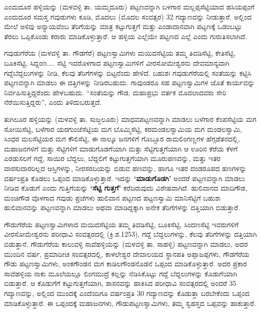 ಎಂಮದೂರ ಹಳ್ಳಿಯನ್ನು (ಮಳವಳ್ಳಿ ತಾ. ಯಮ್ಮದೂರು) ಪಟ್ಟಣವನ್ನಾಗಿ ಬಳಗಾರ ಮಲ್ಲಪ್ಪಸೆಟ್ಟಿಯಾದ ಹಸಿಯಪ್ಪಂಗೆ ಎಂಮದೂರ ಸಮಸ್ತ ಗವುಡುಗಳು ಕೂಡಿ, ಮೊದಲು (ಮೊದಲ ಸಂವತ್ಸರ) 32 ಗದ್ಯಾಣವನ್ನು ನೀಡುತ್ತಾರೆ. ಅಲ್ಲಿಂದ ಮೇಲೆ ಅಳಿವು ಅನ್ಯಾಯವೆಂಬ ತೆರಿಗೆಯನ್ನು ಮಾತ್ರ ಕಟ್ಟುಗುತ್ತಗೆ ಮತ್ತು ಪಿಂಡಾದಾನವಾಗಿ ಪಟ್ಟಣಕ್ಕೆ ಒಡಂಬಟ್ಟು ತೆರಲು ಒಪ್ಪಿಕೊಂಡು ಕರಾರು ಮಾಡಿಕೊಳ್ಳುತ್ತಾರೆ. ಆ ಹಳ್ಳಿಯ ಎಲ್ಲೆಯೇ ಪಟ್ಟಣದ ಎಲ್ಲೆ ಎಂದು ಗುರುತಿಸಲಾಗಿದೆ.

ಗವುಡುಗೆರೆಯ (ಮಳವಳ್ಳಿ ತಾ. ಗೌಡಗೆರೆ) ಪಟ್ಟಣಸ್ವಾಮಿಗಳು ಮಯಿದಸೆಟ್ಟಿಯ ತಮ್ಮ ತಿವಡಿಸೆಟ್ಟಿ, ಕೇತಿಸೆಟ್ಟಿ, ಬೂಕಿಸೆಟ್ಟಿ, ಸಿದ್ದಂಣ.... ಸೆಟ್ಟಿ ಇವರೊಳಗಾದ ಪಟ್ಟಣಸ್ವಾಮಿಗಳಿಗೆ ವೀರಸೋಮೇಶ್ವರನು ದೇವಮಾನ್ಯವಾಗಿ ಗದ್ದೆಬೆದ್ದಲುಗಳನ್ನು ನೀಡಿ, ಕೆಲವು ತೆರಿಗೆಗಳನ್ನು ಬಿಟ್ಟನೆಂದು ಹೇಳಿದೆ. ಬಹುಶಃ ಗವುಡುಗೆರೆಯಲ್ಲಿ ಸಂತೆಯನ್ನು ಕಟ್ಟಿಸಿ ಪಟ್ಟಣವನ್ನಾಗಿ ಮಾಡಲು ಈ ದತ್ತಿಗಳನ್ನು ನೀಡಿರಬಹುದು. ಗಾವುಂಡರೂ ಸಹ ಪಟ್ಟಣಸ್ವಾಮಿಗಳ ಜೊತೆ ಕಾರ್ಯವನ್ನು ನಿರ್ವಹಿಸುತ್ತಿದ್ದರೆಂದು ಹೇಳಬಹುದು. “ಸಂತೆಯನ್ನು ಗೌಡ, ಮಹಾಪ್ರಭು ವರ್ತಕ ಮೊದಲಾದವರು ಸೇರಿ ನೆರೆಯಿಸುತ್ತಿದ್ದರು”, ಎಂದು ತಿಳಿದುಬರುತ್ತದೆ.

ತುಗಿಲೂರ ಹಳ್ಳಿಯನ್ನು (ಮಳವಳ್ಳಿ ತಾ. ಸುಜ್ಜಲೂರು) ಮಾಧವಪಟ್ಟಣವನ್ನಾಗಿ ಮಾಡಲು ಬಳೆಗಾರ ಕೆಂಪಸೆಟ್ಟಿಯ ಮಗ ಸೋಯಿಸೆಟ್ಟಿ, ಬಳೆಗಾರ ಯರಗುಂಜೆಸೆಟ್ಟಿಯ ಮಗ ಬೊಮ್ಮಿಸೆಟ್ಟಿ, ಕರಮಂಡಲಸ್ವಾಮಿಯ ಮಗ ಮಂಡಲಸ್ವಾಮಿ, ಸಿಂಧರ ಮಲಸೆಟ್ಟಿಯರ ಮಗ ಕೌಲಿಸೆಟ್ಟಿ, ಈ ನಾಲ್ಕೂ ಜನಗಳಿಗೆ ಗೊಬ್ಬೂರ ರಾಮಲಿಂಗಣ್ಣಗಳ ಹೆಗ್ಗಡೆತನದಲ್ಲಿ, ಮಹಾಜನಗಳಿಗೆ ಮತ್ತು ಸೆಟ್ಟಿಗಳಿಗೆ ಮಾಡುಗೊಡಗೆಯಾಗಿ ಮತ್ತು ಸೆಟ್ಟಿಗುತ್ತಗೆಯಾಗಿ ಆ ಊರಿನ ಕೆರೆಯ ಕೆಳಗೆ ಎರಡುಸಲಗೆ ಗದ್ದೆ, ಸಾಯಿರ ಬೆದ್ದಲು, ಬೆದ್ದಲಿಗೆ ಕಟ್ಟುಗುತ್ತಗೆಯಾಗಿ ಮೂರುಪಣವನ್ನು, ಮತ್ತು ಇತರ ವಾರಸುದಾರರಿಲ್ಲದ ಆಸ್ತಿಗಳನ್ನು, ನೀರಸರದಿಯನ್ನು ಬಿಡುವ ಹಣವನ್ನು, ಹಾಗೂ ಇತರ ದಂಡರೂಪದ ಹಣಗಳನ್ನು ವರ್ಷಂಪ್ರತಿ ಕೊಡಲು ಒಪ್ಪಂದ ಮಾಡಿಕೊಳ್ಳುತ್ತಾರೆ. ಇದನ್ನು \textbf{‘ಮಾಡುಗೊಡಗಿ’} ಅಂದರೆ ಪಟ್ಟಣವನ್ನಾಗಿ ಮಾಡಲು ನೀಡಿದ ಕೊಡುಗೆ ಎಂದು ಗುತ್ತಿಗೆಯನ್ನು \textbf{‘ಸೆಟ್ಟಿ ಗುತ್ತಗೆ’} ಕರೆದಿರುವುದು ವಿಶೇಷವಾಗಿದೆ. ಹುಲಿವಾನದ ಮಾದಿಗೌಡ, ಮಂಚಿಗೌಡ ವೊಳಗಾದ ಗವುಡು ಪ್ರಜೆಗಳು ಹುಲಿವಾನ ಪಟ್ಟಣದ ಪಟ್ಟಣಸ್ವಾಮಿ ಮಾನಿಸೆಟ್ಟಿಗೆ ಬಹುಶಃ ಹುಲಿವಾನವನ್ನು ಪಟ್ಟಣವನ್ನಾಗಿ ಮಾಡಲು ಅಥವಾ ಮಾಡಿದ್ದಕ್ಕಾಗಿ ಅನೇಕ ತೆರಿಗೆಗಳನ್ನು ದತ್ತಿಯಾಗಿ ಬಿಡುತ್ತಾರೆ.

ಗೌಡುಗೆರೆಯ ಪಟ್ಟಣಸ್ವಾಮಿಗಳಾದ ಮಯಿದಸೆಟ್ಟಿಯ ತಮ್ಮ ತಿವಡಿಸೆಟ್ಟಿ, ಬೂಕಿಸೆಟ್ಟಿ, ಸಿಂದಣಸೆಟ್ಟಿ ಇವರುಗಳಿಗೆ ವೀರಸೋಮೇಶ್ವರನು ಪರೀಧಾವಿ ಸಂವತ್ಸರದಲ್ಲಿ (ಕ್ರಿ.ಶ.1253), ಗದ್ದೆ ಬೆದ್ದಲುಗಳನ್ನು, ಕೆಲವು ತೆರಿಗೆಗಳನ್ನು ದತ್ತಿಯಾಗಿ ಬಿಡುತ್ತಾನೆ. ಗೌಡುಗೆರೆಯ ಕಾಲುವಳ್ಳಿ ಸಾವೆಹಳ್ಳಿಯನ್ನು (ಮಳವಳ್ಳಿ ತಾ. ಸಾಹಳ್ಳಿ) ಪಟ್ಟಣವನ್ನಾಗಿ ಮಾಡಲು, ಅದರ ಮುಂದಿನ ವರ್ಷ, ಪ್ರಮಾದೀಚ ಸಂವತ್ಸರದಲ್ಲಿ, ಕಾಳಲೇಶ್ವರ ದೇವಾಲಯದ ಸ್ಥಾನಪತಿ ಅಪ್ಪಾಜಪ್ಪಗಳು, ಗೌಡಗೆರೆಯ ಗೌಡು ಪಟ್ಟಣಸ್ವಾಮಿಗಳು, ಅಂಕಗೌಂಡನ ಮಗ ಕಾಡಿಲಗೌಂಡನೊಡನೆ ಒಪ್ಪಂದ ಮಾಡಿಕೊಳ್ಳುತ್ತಾರೆ. ಅದರ ಪ್ರಕಾರ ಸಾವೆಹಳ್ಳಿಯ ನಾಕು ಮೂಲೆಯಲ್ಲೂ ಲಿಂಗಮುದ್ರೆ ಕಲ್ಲನ್ನು ನೆಡಿಸಿಕೊಟ್ಟು ಗದ್ದೆ ಬೆದ್ದಲುಗಳನ್ನು ಕೊಡುಗೆಯಾಗಿ ಬಿಡುತ್ತಾರೆ. ಆ ಕೊಡುಗೆಗೆ ಕಟ್ಟುಗುತ್ತಗೆಯಾಗಿ, ಶಾಸನವನ್ನು ಹಾಕಿಸಿದ ಪರೀಧಾವಿ ಸಂವತ್ಸರದಲ್ಲಿ ಅಂದರೆ 35 ಗದ್ಯಾಣವನ್ನು, ಅಲ್ಲಿಂದ ಮುಂದಕ್ಕೆ ಎಂದೆಂದಿಗೂ ವರ್ಷಂಪ್ರತಿ 30 ಗದ್ಯಾಣವನ್ನು ಕೊಡುತ್ತಾ ಬರಬೇಕೆಂದು ಒಪ್ಪಂದ ಮಾಡಿಕೊಳ್ಳುತ್ತಾರೆ. ಈ ಒಪ್ಪಂದಕ್ಕೆ ಮಹಾಜನಗಳು, ಗೌಡುಪಟ್ಟಣಸ್ವಾಮಿಗಳು, ತಮ್ಮ ಸ್ವಹಸ್ತದ ಒಪ್ಪವನ್ನು ಹಾಕುತ್ತಾರೆ.

